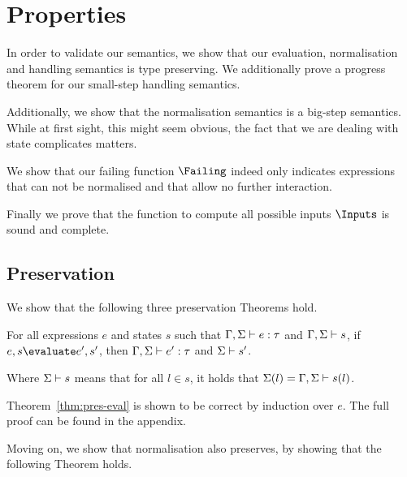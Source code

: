


\section{Properties}
\label{sec:properties}




In order to validate our semantics, we show that our evaluation, normalisation
and handling semantics is type preserving. We additionally prove a progress
theorem for our small-step handling semantics.

Additionally, we show that the normalisation semantics is a big-step semantics.
While at first sight, this might seem obvious, the fact that we are dealing with
state complicates matters.

We show that our failing function $\Failing$ indeed only indicates expressions
that can not be normalised and that allow no further interaction.

Finally we prove that the function to compute all possible inputs $\Inputs$ is sound and complete.



\subsection{Preservation}
\label{sub:preservation}

We show that the following three preservation Theorems hold.

\begin{theorem}
  For all expressions $e$ and states $s$
  such that $\Gamma,\Sigma \vdash e:\tau$ and $\Gamma,\Sigma \vdash s$,
  if $e,s \evaluate e',s'$,
  then $\Gamma,\Sigma \vdash e':\tau$ and $\Sigma \vdash s'$.
  \label{thm:pres-eval}
\end{theorem}

Where $\Sigma \vdash s$ means that for all $l\in s$, it holds that
$\Sigma(l)=\Gamma,\Sigma\vdash s(l)$.

Theorem~\ref{thm:pres-eval} is shown to be correct by induction over $e$. The full
proof can be found in the appendix.


Moving on, we show that normalisation also preserves, by showing that the
following Theorem holds.

